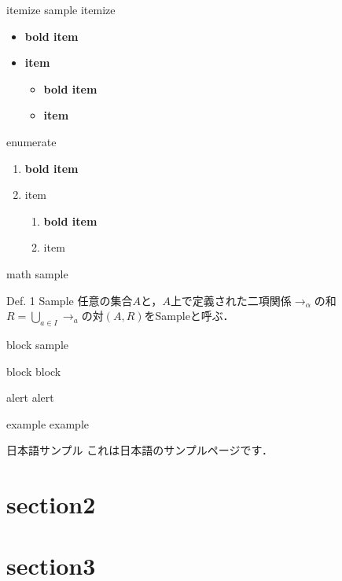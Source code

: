 \documentclass[aspectratio=1610,14pt]{beamer}
\begin{document}
\begin{frame}{itemize sample}
    itemize
    \begin{itemize}
        \item \textbf{bold item}
        \item \textbf{item}
        \begin{itemize}
            \item \textbf{bold item}
            \item \textbf{item}
        \end{itemize}
    \end{itemize}
    \begin{block}{enumerate}
    \begin{enumerate}
        \item \textbf{bold item}
        \item item
        \begin{enumerate}
            \item \textbf{bold item}
            \item item
        \end{enumerate}
    \end{enumerate}
    \end{block}

\end{frame}

\begin{frame}{math sample}
    \begin{block}{Def. 1 Sample}
        任意の集合$A$と，$A$上で定義された二項関係$\to_{\alpha}$の和$R = \bigcup_{a \in I} \to_a $の対$(A, R)$をSampleと呼ぶ．
    \end{block}

\end{frame}

\begin{frame}{block sample}
    \begin{block}{block}
        block
    \end{block}
    \begin{alertblock}{alert}
        alert
    \end{alertblock}
    \begin{exampleblock}{example}
        example
    \end{exampleblock}
\end{frame}

\begin{frame}{日本語サンプル}
    これは日本語のサンプルページです．
\end{frame}

\section{section2}

\begin{frame}
    \tableofcontents[currentsection]
\end{frame}
%
\section{section3}

\begin{frame}
    \tableofcontents[currentsection]
\end{frame}
%
%
%
%
\end{document}

